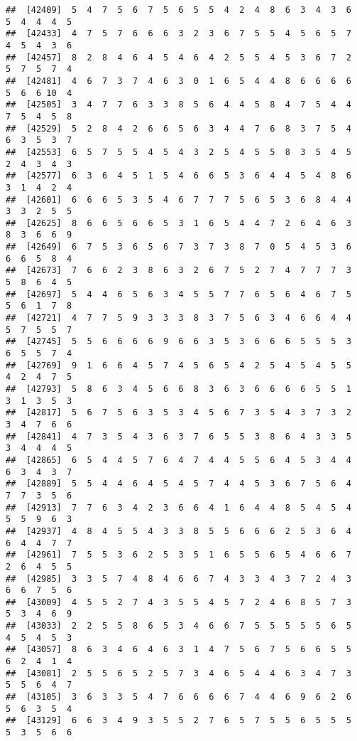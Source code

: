 \documentclass[
]{book}
\begin{document}
\begin{verbatim}
##  [42409]  5  4  7  5  6  7  5  6  5  5  4  2  4  8  6  3  4  3  6  5  4  4  4  5
##  [42433]  4  7  5  7  6  6  6  3  2  3  6  7  5  5  4  5  6  5  7  4  5  4  3  6
##  [42457]  8  2  8  4  6  4  5  4  6  4  2  5  5  4  5  3  6  7  2  5  7  5  7  4
##  [42481]  4  6  7  3  7  4  6  3  0  1  6  5  4  4  8  6  6  6  6  5  6  6 10  4
##  [42505]  3  4  7  7  6  3  3  8  5  6  4  4  5  8  4  7  5  4  4  7  5  4  5  8
##  [42529]  5  2  8  4  2  6  6  5  6  3  4  4  7  6  8  3  7  5  4  6  3  5  3  7
##  [42553]  6  5  7  5  5  4  5  4  3  2  5  4  5  5  8  3  5  4  5  2  4  3  4  3
##  [42577]  6  3  6  4  5  1  5  4  6  6  5  3  6  4  4  5  4  8  6  3  1  4  2  4
##  [42601]  6  6  6  5  3  5  4  6  7  7  7  5  6  5  3  6  8  4  4  3  3  2  5  5
##  [42625]  8  6  6  5  6  6  5  3  1  6  5  4  4  7  2  6  4  6  3  8  3  6  6  9
##  [42649]  6  7  5  3  6  5  6  7  3  7  3  8  7  0  5  4  5  3  6  6  6  5  8  4
##  [42673]  7  6  6  2  3  8  6  3  2  6  7  5  2  7  4  7  7  7  3  5  8  6  4  5
##  [42697]  5  4  4  6  5  6  3  4  5  5  7  7  6  5  6  4  6  7  5  5  6  1  7  8
##  [42721]  4  7  7  5  9  3  3  3  8  3  7  5  6  3  4  6  6  4  4  5  7  5  5  7
##  [42745]  5  5  6  6  6  6  9  6  6  3  5  3  6  6  6  5  5  5  3  6  5  5  7  4
##  [42769]  9  1  6  6  4  5  7  4  5  6  5  4  2  5  4  5  4  5  5  4  2  4  7  5
##  [42793]  5  8  6  3  4  5  6  6  8  3  6  3  6  6  6  6  5  5  1  3  1  3  5  3
##  [42817]  5  6  7  5  6  3  5  3  4  5  6  7  3  5  4  3  7  3  2  3  4  7  6  6
##  [42841]  4  7  3  5  4  3  6  3  7  6  5  5  3  8  6  4  3  3  5  3  4  4  4  5
##  [42865]  6  5  4  4  5  7  6  4  7  4  4  5  5  6  4  5  3  4  4  6  3  4  3  7
##  [42889]  5  5  4  4  6  4  5  4  5  7  4  4  5  3  6  7  5  6  4  7  7  3  5  6
##  [42913]  7  7  6  3  4  2  3  6  6  4  1  6  4  4  8  5  4  5  4  5  5  9  6  3
##  [42937]  4  8  4  5  5  4  3  3  8  5  5  6  6  6  2  5  3  6  4  6  4  4  7  7
##  [42961]  7  5  5  3  6  2  5  3  5  1  6  5  5  6  5  4  6  6  7  2  6  4  5  5
##  [42985]  3  3  5  7  4  8  4  6  6  7  4  3  3  4  3  7  2  4  3  6  6  7  5  6
##  [43009]  4  5  5  2  7  4  3  5  5  4  5  7  2  4  6  8  5  7  3  5  3  4  6  9
##  [43033]  2  2  5  5  8  6  5  3  4  6  6  7  5  5  5  5  5  6  5  4  5  4  5  3
##  [43057]  8  6  3  4  6  4  6  3  1  4  7  5  6  7  5  6  6  5  5  6  2  4  1  4
##  [43081]  2  5  5  6  5  2  5  7  3  4  6  5  4  4  6  3  4  7  3  5  5  6  4  7
##  [43105]  3  6  3  3  5  4  7  6  6  6  6  7  4  4  6  9  6  2  6  5  6  3  5  4
##  [43129]  6  6  3  4  9  3  5  5  2  7  6  5  7  5  5  6  5  5  5  5  3  5  6  6

\end{verbatim}
\end{document}
